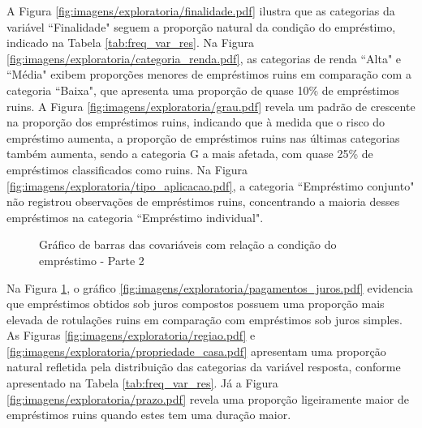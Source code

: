 A Figura \ref{fig:imagens/exploratoria/finalidade.pdf} ilustra que as categorias da variável ``Finalidade" 
seguem a proporção natural da condição do empréstimo,
indicado na Tabela \ref{tab:freq_var_res}. Na Figura \ref{fig:imagens/exploratoria/categoria_renda.pdf}, 
as categorias de renda ``Alta" e ``Média"
exibem proporções menores de empréstimos ruins em comparação com a categoria ``Baixa", que apresenta uma proporção de quase 10\% 
de empréstimos ruins. A Figura \ref{fig:imagens/exploratoria/grau.pdf} revela um padrão de crescente na proporção
dos empréstimos ruins, indicando que à medida que o risco do 
empréstimo aumenta, a proporção de empréstimos ruins nas últimas categorias também aumenta, 
sendo a categoria G a mais afetada, com quase 25\% de empréstimos classificados como ruins. 
Na Figura \ref{fig:imagens/exploratoria/tipo_aplicacao.pdf}, a categoria ``Empréstimo conjunto" 
não registrou observações de empréstimos ruins, 
concentrando a maioria desses empréstimos na categoria ``Empréstimo individual".


\begin{figure}[H]
  \centering
  \vspace{.5cm}
  \vspace{.5cm}

  \caption{Gráfico de barras das covariáveis com relação a condição do empréstimo - Parte 2}
  \label{fig:exp_bar2}
\end{figure}

Na Figura \ref{fig:exp_bar2}, o gráfico \ref{fig:imagens/exploratoria/pagamentos_juros.pdf} 
evidencia que empréstimos obtidos sob juros compostos possuem uma proporção 
mais elevada de rotulações ruins em comparação com empréstimos sob juros simples. As Figuras \ref{fig:imagens/exploratoria/regiao.pdf} 
e \ref{fig:imagens/exploratoria/propriedade_casa.pdf}
apresentam uma proporção natural refletida pela distribuição das categorias da variável resposta, 
conforme apresentado na Tabela \ref{tab:freq_var_res}. Já a Figura \ref{fig:imagens/exploratoria/prazo.pdf} 
revela uma proporção ligeiramente maior
de empréstimos ruins quando estes tem uma duração maior.


